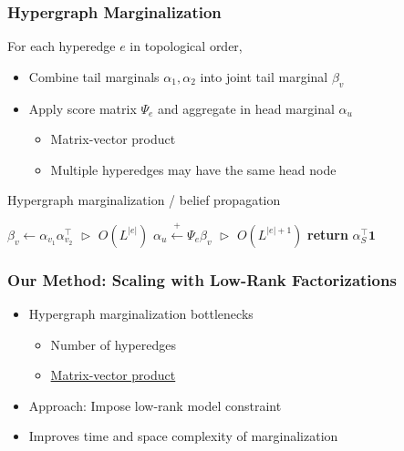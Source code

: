 \documentclass{beamer}
\begin{document}
\begin{frame}
\frametitle{Hypergraph Marginalization}
For each hyperedge $e$ in topological order,
\vspace{1em}
\begin{itemize}
\item Combine tail marginals $\alpha_1,\alpha_2$ into joint tail marginal $\beta_v$
\vspace{1em}
\item Apply score matrix $\Psi_e$ and aggregate in head marginal $\alpha_u$
    \begin{itemize}
    \item Matrix-vector product
    \item Multiple hyperedges may have the same head node
    \end{itemize}
\end{itemize}
\vspace{1em}
\centering
\begin{algorithm}[H]
\caption{\label{alg:hypergraph-marg} Hypergraph marginalization / belief propagation}
\begin{algorithmic} 
\STATE $\beta_v \gets \alpha_{v_1}\alpha_{v_2}^\top$
    \hfill $\vartriangleright$ $O(L^{|e|})$
\STATE $\alpha_u \stackrel{+}{\gets} \Psi_e\beta_v$
    \hfill $\vartriangleright$ $O(L^{|e|+1})$
\ENDFOR
\STATE \textbf{return} $\alpha_S^\top \mathbf{1}$
\end{algorithmic}

\end{algorithm}
\end{frame}

\begin{frame}
\frametitle{Our Method: Scaling with Low-Rank Factorizations}
\begin{itemize}
\item Hypergraph marginalization bottlenecks
    \begin{itemize}
    \item Number of hyperedges
    \item \underline{Matrix-vector product}
    \end{itemize}
\vspace{1em}
\item Approach: Impose low-rank model constraint
\vspace{1em}
\item Improves time and space complexity of marginalization
\end{itemize}
\end{frame}
\end{document}
